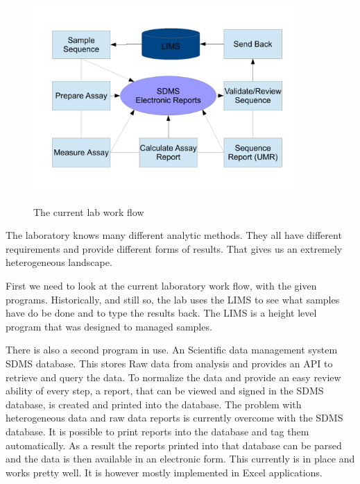 \documentclass[paper=a4,twoside=false,BCOR=0mm,DIV=calc,fontsize=12pt]{scrartcl}
\begin{document}
\begin{figure}
    \begin{center}
      \includegraphics[width=0.9\textwidth]{./img/Laboverview.pdf}\\
    \end{center}
  \caption{The current lab work flow}
  \label{CurrentLabWorkflow}
\end{figure} 


The laboratory knows many different analytic methods. They all have different requirements and provide different forms of results. That gives us an extremely heterogeneous landscape. 

First we need to look at the current laboratory work flow, with the given programs. Historically, and still so, the lab uses the LIMS to see what samples have do be done and to type the results back. The LIMS is a height level program that was designed to managed samples.

There is also a second program in use. An Scientific data management system SDMS \cite{sdms} database. This stores Raw data from analysis and provides an API to retrieve and query the data.
To normalize the data and provide an easy review ability of every step, a report, that can be viewed and signed in the SDMS database, is created and printed into the database.
The problem with heterogeneous data and raw data reports is currently overcome with the SDMS database. It is possible to print reports into the database and tag them automatically. As a result the reports printed into that database can be parsed and the data is then available in an electronic form. This currently is in place and works pretty well.
It is however mostly implemented in Excel \cite{excel} applications.
\end{document}
